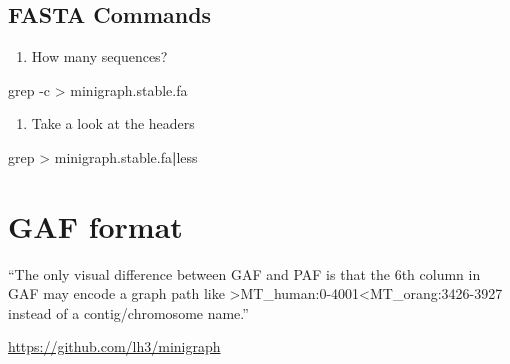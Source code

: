 \documentclass[
]{book}
\newenvironment{Shaded}{\begin{snugshade}}{\end{snugshade}}
\newcommand{\AttributeTok}[1]{\textcolor[rgb]{0.77,0.63,0.00}{#1}}
\newcommand{\FunctionTok}[1]{\textcolor[rgb]{0.00,0.00,0.00}{#1}}
\newcommand{\KeywordTok}[1]{\textcolor[rgb]{0.13,0.29,0.53}{\textbf{#1}}}
\newcommand{\NormalTok}[1]{#1}
\newcommand{\StringTok}[1]{\textcolor[rgb]{0.31,0.60,0.02}{#1}}
\providecommand{\tightlist}{%
  \setlength{\itemsep}{0pt}\setlength{\parskip}{0pt}}
\begin{document}
\begin{Shaded}
\begin{Highlighting}[]

\end{Highlighting}
\end{Shaded}

\hypertarget{fasta-commands}{%
\subsection*{FASTA Commands}\label{fasta-commands}}

\begin{enumerate}
\def\labelenumi{\arabic{enumi}.}
\tightlist
\item
  How many sequences?
\end{enumerate}

\begin{Shaded}
\begin{Highlighting}[]
\FunctionTok{grep} \AttributeTok{{-}c} \StringTok{\textquotesingle{}\textgreater{}\textquotesingle{}}\NormalTok{ minigraph.stable.fa}
\end{Highlighting}
\end{Shaded}

\begin{enumerate}
\def\labelenumi{\arabic{enumi}.}
\setcounter{enumi}{1}
\tightlist
\item
  Take a look at the headers
\end{enumerate}

\begin{Shaded}
\begin{Highlighting}[]
\FunctionTok{grep} \StringTok{\textquotesingle{}\textgreater{}\textquotesingle{}}\NormalTok{ minigraph.stable.fa}\KeywordTok{|}\FunctionTok{less}
\end{Highlighting}
\end{Shaded}

\hypertarget{gaf-format}{%
\section{GAF format}\label{gaf-format}}

``The only visual difference between GAF and PAF is that the 6th column in GAF may encode a graph path like \textgreater MT\_human:0-4001\textless MT\_orang:3426-3927 instead of a contig/chromosome name.''

\url{https://github.com/lh3/minigraph}
\end{document}
